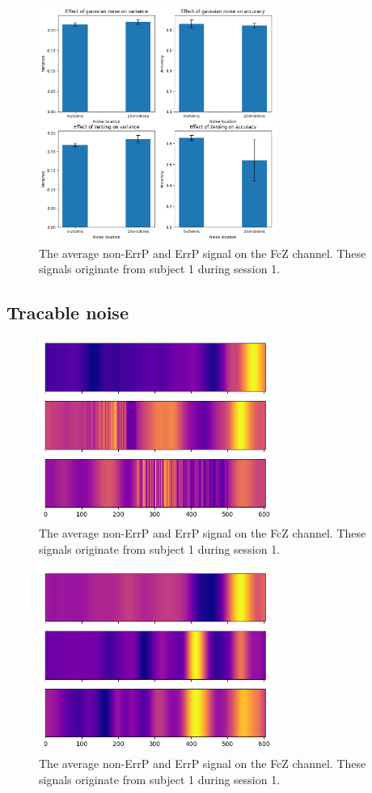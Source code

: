 \begin{figure}[!tbp]
    \centering
        \includegraphics[width=7.7cm]{img/local.png}
    \caption{The average non-ErrP and ErrP signal on the FcZ channel. These signals originate from subject 1 during session 1.}
    \label{fig:local}
\end{figure}

\subsection{Tracable noise}

\begin{figure}[!tbp]
    \centering
        \includegraphics[width=7.7cm]{img/gaussian_shap.png}
    \caption{The average non-ErrP and ErrP signal on the FcZ channel. These signals originate from subject 1 during session 1.}
    \label{fig:gaussian_shap}
\end{figure}

\begin{figure}[!tbp]
    \centering
        \includegraphics[width=7.7cm]{img/zeroed_shap.png}
    \caption{The average non-ErrP and ErrP signal on the FcZ channel. These signals originate from subject 1 during session 1.}
    \label{fig:zeroed_shap}
\end{figure}